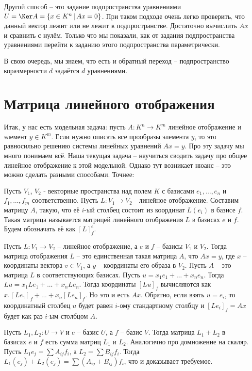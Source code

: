 Другой способ -- это задание подпространства уравнениями $U=\Ker A = \{ x\in K^n \,|\, Ax=0\}$. При таком подходе очень легко проверить, что данный вектор лежит или не лежит в подпространстве. Достаточно вычислить $
Ax$ и сравнить с нулём. Только что мы показали, как от задания подпространства уравнениями перейти к заданию этого подпространства параметрически. 

В свою очередь, мы знаем, что есть и обратный переход -- подпространство коразмерности $d$ задаётся $d$ уравнениями. 


\section{Матрица линейного отображения}


Итак, у нас есть модельная задача: пусть $A \colon K^n \to K^m$ линейное отображение и элемент $y \in K^m$. Если нужно описать все прообразы элемента $y$, то это равносильно решению системы линейных уравнений $Ax=y$. Про эту задачу мы много понимаем всё.
Наша текущая задача -- научиться сводить задачу про общее линейное отображение к этой модельной. Однако тут возникает нюанс -- это можно сделать разными способами. Точнее:

\dfn
Пусть $V_1$, $V_2$ - векторные пространства над полем $K$ с базисами $e_1,\dots, e_n$ и $f_1,\dots, f_m$ соответственно. Пусть $L\colon V_1\to V_2$ - линейное отображение. Составим матрицу $A$, такую, что её $i$-ый столбец состоит из координат $L(e_i)$ в базисе $f$. Такая матрица называется матрицей линейного отображения $L$ в базисах $e$ и $f$. Будем обозначать её как $[L]^e_f$.
\edfn




\thrm Пусть $L \colon V_1 \to V_2$ -- линейное отображение, а $e$ и $f$ -- базисы  $V_1$  и $V_2$. Тогда матрица отображения $L$ -- это единственная такая матрица $A$, что $Ax=y$, где $x$ -- координаты вектора $v\in V_1$, а $y$ -- координаты его образа в $V_2$.
\ethrm
\proof Пусть $A$ -- это матрица $L$ в соответствующих базисах. Пусть $u=x_1e_1+\dots+x_ne_n$. Тогда $L u =x_1Le_1+\dots+x_n Le_n$. Тогда координаты $[Lu]_f$  вычисляются как $x_1[Le_1]_f+\dots+x_n[Le_n]_f$. Но это и есть $Ax$.
Обратно, если взять $u=e_i$, то координатный столбец $u$ будет равен $i$-ому стандартному столбцу и $[Le_i]_f=Ax$ будет как раз $i$-ым столбцом $A$.
\endproof


\utv Пусть $L_1,L_2\colon U \to V$ и $e$ -- базис $U$, а $f$ -- базис $V$. Тогда матрица $L_1+L_2$ в базисах $e$ и $f$ есть сумма матриц $L_1$ и $L_2$. Аналогично про домножение на скаляр.
\eutv
\proof Пусть $L_1 e_j= \sum A_{ij}f_i$, а $L_2=\sum B_{ij}f_i$. Тогда $L_1(e_j)+L_2(e_j)=\sum (A_{ij}+B_{ij})f_i$, что и доказывает требуемое.
\endproof


